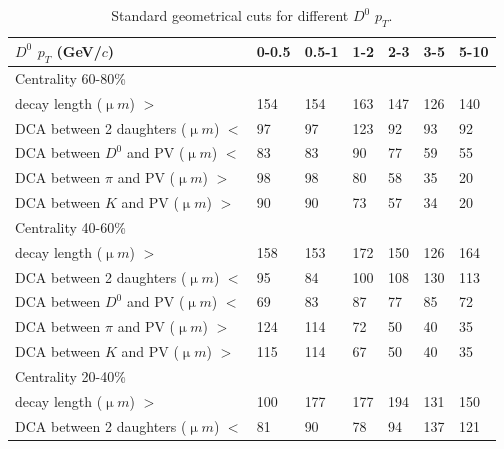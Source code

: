 \begin{table}[htp]
  \centering
  \caption{Standard geometrical cuts for different $D^0$ $p_T$.}
  \label{geometryCutsLoose}
  \begin{center}
    \begin{tabular}{l|l|l|l|l|l|l}
      $D^0$ $p_T$ (GeV/$c$) & 0-0.5 & 0.5-1 & 1-2 & 2-3 & 3-5 & 5-10\\ \hline
      Centrality  60-80\% & &  & &  & & \\ \hline
      decay length (${\upmu}m$) $>$ & 154 & 154 & 163 & 147 & 126 & 140\\ \hline
      DCA between 2 daughters (${\upmu}m$) $<$ & 97 & 97 & 123 & 92 & 93 & 92\\ \hline
      DCA between $D^0$ and PV (${\upmu}m$) $<$ & 83 & 83 & 90 & 77 & 59 & 55\\ \hline
      DCA between $\pi$ and PV (${\upmu}m$) $>$ & 98 & 98 & 80 & 58 & 35 & 20\\ \hline
      DCA between $K$ and PV (${\upmu}m$) $>$ & 90 & 90 & 73 & 57 & 34 & 20\\ \hline
      Centrality  40-60\% &  &  &  &  & & \\ \hline
      decay length (${\upmu}m$) $>$ & 158 & 153 & 172 & 150 & 126 & 164\\ \hline
      DCA between 2 daughters (${\upmu}m$) $<$ & 95 & 84 & 100 & 108 & 130 & 113\\ \hline
      DCA between $D^0$ and PV (${\upmu}m$) $<$ & 69 & 83 & 87 & 77 & 85 & 72\\ \hline
      DCA between $\pi$ and PV (${\upmu}m$) $>$ & 124 & 114 & 72 & 50 & 40 & 35\\ \hline
      DCA between $K$ and PV (${\upmu}m$) $>$ & 115 & 114 & 67 & 50 & 40 & 35\\ \hline
      Centrality  20-40\% &  &  &  &  & & \\ \hline
      decay length (${\upmu}m$) $>$ & 100 & 177 & 177 & 194 & 131 & 150\\ \hline
      DCA between 2 daughters (${\upmu}m$) $<$ & 81 & 90 & 78 & 94 & 137 & 121\\ \hline

\end{tabular}
\end{center}
\end{table}
